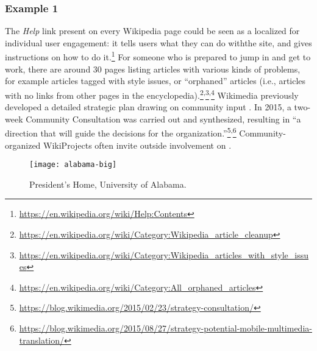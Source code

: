 \subsubsection*{Example 1}  The \emph{Help} link present on every Wikipedia page could be seen as a
localized  for individual user
engagement: it tells users what they can do withthe site, and gives instructions on how to do it.\footnote{\url{https://en.wikipedia.org/wiki/Help:Contents}}
For someone who is prepared to jump in and get to work, there are
around 30 pages listing articles with various kinds of problems, for
example articles tagged with style issues, or ``orphaned'' articles
(i.e., articles with no links from other pages in the
encyclopedia).\footnote{\url{https://en.wikipedia.org/wiki/Category:Wikipedia_article_cleanup}}\textsuperscript{,}\footnote{\url{https://en.wikipedia.org/wiki/Category:Wikipedia_articles_with_style_issues}}\textsuperscript{,}\footnote{\url{https://en.wikipedia.org/wiki/Category:All_orphaned_articles}}
%
%
Wikimedia previously developed
a detailed strategic plan drawing on community input
\cite{wikimedia2011plan}.  In 2015, a two-week 
Community Consultation was carried out and
synthesized, resulting in ``a direction that will guide the decisions for the organization.''\footnote{\url{https://blog.wikimedia.org/2015/02/23/strategy-consultation/}}\textsuperscript{,}\footnote{\url{https://blog.wikimedia.org/2015/08/27/strategy-potential-mobile-multimedia-translation/}}
%
%
 Community-organized WikiProjects often invite outside involvement on .

\begingroup
\setlength{\columnsep}{6pt}%

\begin{wrapfigure}{r}{.32\textwidth}
\vspace{-.9cm}
{\centering
\texttt{[image: alabama-big]}

\par}
\vspace{-.5cm}
\caption{President's Home, University of Alabama.
\label{presidents-home}}
\vspace{-.8cm}
\end{wrapfigure}

